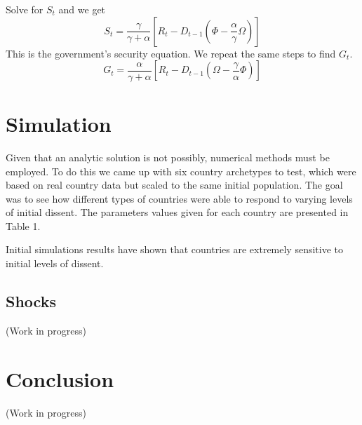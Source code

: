 \documentclass[12pt]{article}
\begin{document}
\begin{spacing}{1.5}
\noindent Solve for $S_t$ and we get
\begin{equation}
S_t=\frac{\gamma }{\gamma  +\alpha} \left[ R_t - D_{t-1} \left(\Phi - \frac{\alpha}{\gamma }\Omega \right) \right]
\end{equation}
\noindent This is the government's security equation. We repeat the same steps to find $G_t$. 
\begin{equation}
G_t=\frac{\alpha}{\gamma  +\alpha} \left[ R_t - D_{t-1} \left(\Omega - \frac{\gamma }{\alpha}\Phi \right) \right]
\end{equation}

\section{Simulation} 

Given that an analytic solution is not possibly, numerical methods must be employed. To do this we came up with six country archetypes to test, which were based on real country data but scaled to the same initial population. The goal was to see how different types of countries were able to respond to varying levels of initial dissent. The parameters values given for each country are presented in Table 1. 

\begin{figure}[htb]
\end{figure}

Initial simulations results have shown that countries are extremely sensitive to initial levels of dissent.

\subsection{Shocks}

(Work in progress)

\section{Conclusion}


(Work in progress)




\end{spacing}


\pagebreak




\nocite{*}
\end{document}
